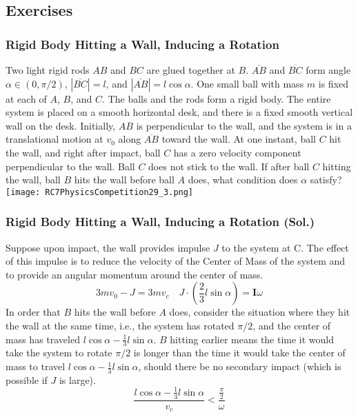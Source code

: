 \subsection{Exercises}
\begin{frame}
\frametitle{Rigid Body Hitting a Wall, Inducing a Rotation}
\begin{multicols}{2}
Two light rigid rods $AB$ and $BC$ are glued together at $B$. $\overline{AB}$ and $\overline{BC}$ form angle $\alpha\in(0,\pi/2)$, $|\overline{BC}|=l$, and $|\overline{AB}|=l\cos\alpha$. One small ball with mass $m$ is fixed at each of $A$, $B$, and $C$. The balls and the rods form a rigid body. The entire system is placed on a smooth horizontal desk, and there is a fixed smooth vertical wall on the desk. Initially, $AB$ is perpendicular to the wall, and the system is in a translational motion at $v_0$ along $\overline{AB}$ toward the wall. At one instant, ball $C$ hit the wall, and right after impact, ball $C$ has a zero velocity component perpendicular to the wall. Ball $C$ does not stick to the wall. If after ball $C$ hitting the wall, ball $B$ hits the wall before ball $A$ does, what condition does $\alpha$ satisfy?
\texttt{[image: RC7PhysicsCompetition29\_3.png]}
\end{multicols}
\end{frame}
\begin{frame}
\frametitle{Rigid Body Hitting a Wall, Inducing a Rotation (Sol.)}
Suppose upon impact, the wall provides impulse $J$ to the system at C. The effect of this impulse is to reduce the \alert{velocity} of the Center of Mass of the system and to provide an \alert{angular momentum} around the center of mass.
\begin{equation}\label{eq:rc7exphysicscompetitionimpulse}
3mv_0-J=3mv_c\quad J\cdot(\frac{2}{3}l\sin\alpha)=\mathbf{I}\omega
\end{equation}
In order that $B$ hits the wall before $A$ does, consider the situation where they hit the wall at the same time, i.e., the system has rotated $\pi/2$, and the center of mass has traveled $l\cos\alpha-\frac{1}{3}l\sin\alpha$. $B$ hitting earlier means the time it would take the system to rotate $\pi/2$ is longer than the time it would take the center of mass to travel $l\cos\alpha-\frac{1}{3}l\sin\alpha$, should there be no secondary impact (which is possible if $J$ is large).
\begin{equation}\label{equation:rc7physicscomptitionconstraint}
\frac{l\cos\alpha-\frac{1}{3}l\sin\alpha}{v_c}<\frac{\frac{\pi}{2}}{\omega}
\end{equation}
\end{frame}
